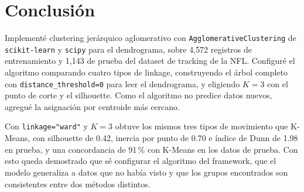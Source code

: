 \documentclass[11pt,a4paper]{article}
\begin{document}
\section{Conclusión}

Implementé clustering jerárquico aglomerativo con \texttt{AgglomerativeClustering} de \texttt{scikit-learn} y \texttt{scipy} para el dendrograma, sobre 4{,}572 registros de entrenamiento y 1{,}143 de prueba del dataset de tracking de la NFL. Configuré el algoritmo comparando cuatro tipos de linkage, construyendo el árbol completo con \texttt{distance\_threshold=0} para leer el dendrograma, y eligiendo $K=3$ con el punto de corte y el silhouette. Como el algoritmo no predice datos nuevos, agregué la asignación por centroide más cercano.

Con \texttt{linkage="ward"} y $K=3$ obtuve los mismos tres tipos de movimiento que K-Means, con silhouette de 0.42, inercia por punto de 0.70 e índice de Dunn de 1.98 en prueba, y una concordancia de 91\,\% con K-Means en los datos de prueba. Con esto queda demostrado que sé configurar el algoritmo del framework, que el modelo generaliza a datos que no había visto y que los grupos encontrados son consistentes entre dos métodos distintos.
\end{document}
